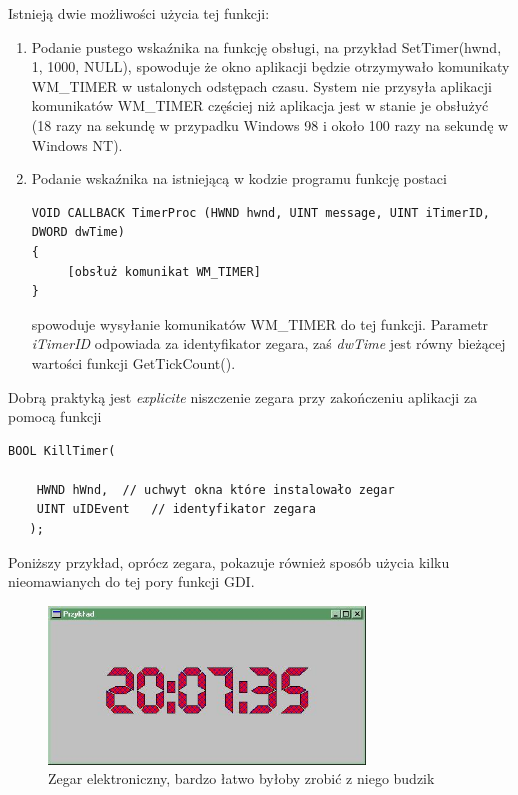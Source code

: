 Istnieją dwie możliwości użycia tej funkcji:
\begin{enumerate}
\item Podanie pustego wskaźnika na funkcję obsługi, na przykład SetTimer(hwnd, 1, 1000, NULL),
spowoduje że okno aplikacji będzie otrzymywało komunikaty WM\_TIMER w ustalonych odstępach czasu.
System nie przysyła aplikacji komunikatów WM\_TIMER częściej niż aplikacja jest w stanie
je obsłużyć (18 razy na sekundę w przypadku Windows 98 i około 100 razy na sekundę w Windows NT).

\item Podanie wskaźnika na istniejącą w kodzie programu funkcję postaci

\begin{scriptsize}
\begin{verbatim}
VOID CALLBACK TimerProc (HWND hwnd, UINT message, UINT iTimerID, DWORD dwTime)
{
     [obsłuż komunikat WM_TIMER]
}
\end{verbatim}
\end{scriptsize}

spowoduje wysyłanie komunikatów WM\_TIMER do tej funkcji. Parametr {\em iTimerID} odpowiada za
identyfikator zegara, zaś {\em dwTime} jest równy bieżącej wartości funkcji GetTickCount().

\end{enumerate}

Dobrą praktyką jest {\em explicite} niszczenie zegara przy zakończeniu aplikacji za pomocą funkcji

\begin{scriptsize}
\begin{verbatim}
BOOL KillTimer(

    HWND hWnd,	// uchwyt okna które instalowało zegar
    UINT uIDEvent 	// identyfikator zegara
   );
\end{verbatim}
\end{scriptsize}

Poniższy przykład, oprócz zegara, pokazuje również sposób użycia kilku
nieomawianych do tej pory funkcji GDI.

\begin{figure}
\begin{center}
\includegraphics[width=0.75\textwidth]{./pic/p04}
\caption{Zegar elektroniczny, bardzo łatwo byłoby zrobić z niego budzik}
\end{center}
\end{figure}

